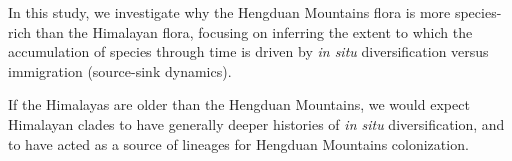 


In this study, we investigate why the Hengduan Mountains flora is more species-rich than the Himalayan flora, focusing on inferring the extent to which the accumulation of species through time is driven by \textit{in situ} diversification versus immigration (source-sink dynamics).

If the Himalayas are older than the Hengduan Mountains, we would expect Himalayan clades to have generally deeper histories of \textit{in situ} diversification, and to have acted as a source of lineages for Hengduan Mountains colonization.


